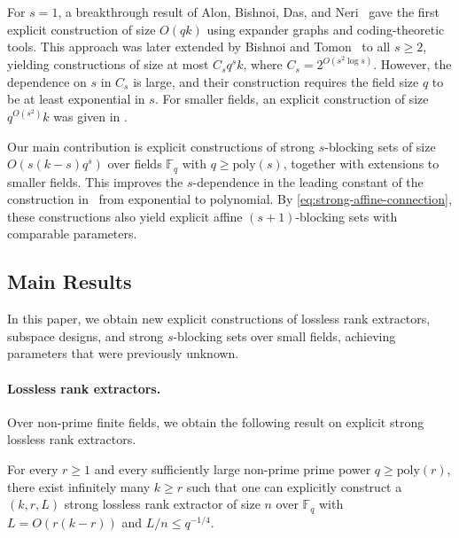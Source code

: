 \documentclass[11pt]{article}
\newif\ifdraft
\newcommand{\ZGnote}[1]{\ifdraft\textcolor{blue}{[Zeyu: #1]}\fi}
\newcommand{\ZSnote}[1]{\ifdraft\textcolor{green}{[Chong: #1]}\fi}
\newcommand{\F}{\mathbb{F}}
\newcommand{\poly}{\mathrm{poly}}
\begin{document}
For $s=1$, a breakthrough result of Alon, Bishnoi, Das, and Neri~\cite{ABDN24} gave the first explicit construction of size $O(qk)$ using expander graphs and coding-theoretic tools. This approach was later extended by Bishnoi and Tomon~\cite{BT24} to all $s \ge 2$, yielding constructions of size at most $C_s q^s k$, where $C_s = 2^{O(s^2 \log s)}$. However, the dependence on $s$ in $C_s$ is large, and their construction requires the field size $q$ to be at least exponential in $s$. For smaller fields, an explicit construction of size $q^{O(s^2)}k$ was given in \cite{BT24}. 



Our main contribution is explicit constructions of strong $s$-blocking sets of size $O(s(k-s) q^s)$ over fields $\F_q$ with $q\geq \poly(s)$, together with extensions to smaller fields. This improves the $s$-dependence in the leading constant of the construction in~\cite{BT24} from exponential to polynomial. By \eqref{eq:strong-affine-connection}, these constructions also yield explicit affine $(s+1)$-blocking sets with comparable parameters.

\subsection{Main Results}

In this paper, we obtain new explicit constructions of lossless rank extractors, subspace designs, and strong $s$-blocking sets over small fields, achieving parameters that were previously unknown.

\paragraph{Lossless rank extractors.} Over non-prime finite fields, we obtain the following result on explicit strong lossless rank extractors.

\begin{theorem}\label{thm:rankboundinformal}
For every $r\geq 1$ and every sufficiently large non-prime prime power $q\geq \poly(r)$, there exist infinitely many $k\geq r$ such that one can explicitly construct a $(k,r,L)$ strong lossless rank extractor of size $n$ over $\F_q$ with $L=O(r(k-r))$ and $L/n\leq q^{-1/4}$.
\end{theorem}
\end{document}
